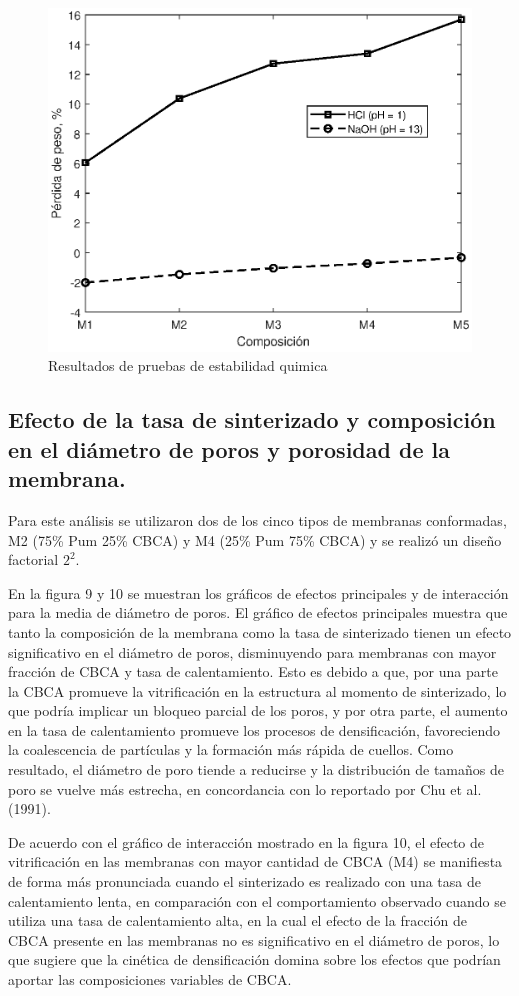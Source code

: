 \documentclass{article}
\begin{document}
\begin{figure}[ht]
    \centering
    \includegraphics[width=0.5\linewidth]{Graphics/ChemStability.eps}
    \caption{Resultados de pruebas de estabilidad quimica}
    \label{fig:EstabilidadQuimica}
\end{figure}

\subsection{Efecto de la tasa de sinterizado y composición en el diámetro de poros y porosidad de la membrana. }

Para este análisis se utilizaron dos de los cinco tipos de membranas conformadas, M2 (75\% Pum 25\% CBCA) y M4 (25\% Pum 75\% CBCA) y se realizó un diseño factorial $2^2$.

En la figura 9 y 10 se muestran los gráficos de efectos principales y de interacción para la media de diámetro de poros. El gráfico de efectos principales muestra que tanto la composición de la membrana como la tasa de sinterizado tienen un efecto significativo en el diámetro de poros, disminuyendo para membranas con mayor fracción de CBCA y tasa de calentamiento. Esto es debido a que, por una parte la CBCA promueve la vitrificación en la estructura al momento de sinterizado, lo que podría implicar un bloqueo parcial de los poros, y por otra parte, el aumento en la tasa de calentamiento promueve los procesos de densificación, favoreciendo la coalescencia de partículas y la formación más rápida de cuellos. Como resultado, el diámetro de poro tiende a reducirse y la distribución de tamaños de poro se vuelve más estrecha, en concordancia con lo reportado por Chu et al. (1991). 

De acuerdo con el gráfico de interacción mostrado en la figura 10, el efecto de vitrificación en las membranas con mayor cantidad de CBCA (M4) se manifiesta de forma más pronunciada cuando el sinterizado es realizado con una tasa de calentamiento lenta, en comparación con el comportamiento observado cuando se utiliza una tasa de calentamiento alta, en la cual el efecto de la fracción de CBCA presente en las membranas no es significativo en el diámetro de poros, lo que sugiere que la cinética de densificación domina sobre los efectos que podrían aportar las composiciones variables de CBCA. 
\end{document}
